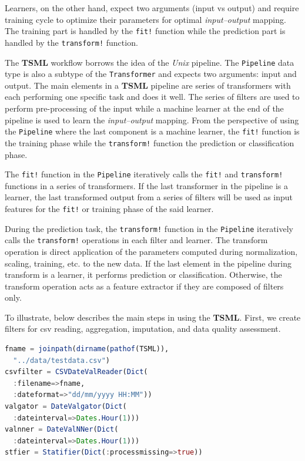 \documentclass{juliacon}
\begin{document}
\vskip 6pt

Learners, on the other hand, expect two arguments (input vs output) and require training cycle to optimize their parameters for optimal \emph{input--output} mapping. The training part is handled by the \texttt{fit!} function while the prediction part is handled by the \texttt{transform!} function. 

\vskip 6pt

The \textbf{TSML} workflow borrows the idea of the  \emph{Unix} pipeline\cite{orchestra2014, combineml2016}. 
The \texttt{Pipeline} data type is also a subtype of the \texttt{Transformer} and expects two arguments: input and output. The main elements in a \textbf{TSML} pipeline are series of transformers with each performing one specific task and does it well. The series of filters are used to perform pre-processing of the input while a machine learner at the end of the pipeline is used to learn the \emph{input--output} mapping. From the perspective of using the \texttt{Pipeline} where the last component is a machine learner, the \texttt{fit!} function is the training phase while the \texttt{transform!} function the prediction or classification phase.
\vskip 6pt

The \texttt{fit!} function in the \texttt{Pipeline} iteratively calls the \texttt{fit!} and \texttt{transform!} functions in a series of transformers. If the last transformer in the pipeline is a learner, the last transformed output from a series of filters will be used as input features for the \texttt{fit!} or training phase of the said learner.

\vskip 6pt

During the prediction task, the \texttt{transform!} function in the \texttt{Pipeline} iteratively calls the \texttt{transform!} operations in each filter and learner. The transform operation is direct application of the parameters computed during normalization, scaling, training, etc. to the new data. If the last element in the pipeline during transform is a learner, it performs prediction or classification. Otherwise, the transform operation acts as a feature extractor if they are composed of filters only.

\vskip 6pt
To illustrate, below describes the main steps in using the \textbf{TSML}.
First, we create filters for csv reading, aggregation, imputation, and data quality
assessment.

\begin{lstlisting}[language = Julia]
fname = joinpath(dirname(pathof(TSML)),
  "../data/testdata.csv")
csvfilter = CSVDateValReader(Dict(
  :filename=>fname,
  :dateformat=>"dd/mm/yyyy HH:MM"))
valgator = DateValgator(Dict(
  :dateinterval=>Dates.Hour(1)))
valnner = DateValNNer(Dict(
  :dateinterval=>Dates.Hour(1)))
stfier = Statifier(Dict(:processmissing=>true))
\end{lstlisting}
\end{document}

